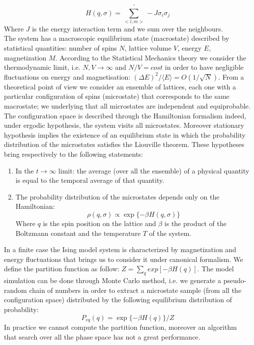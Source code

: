 \documentclass[11pt,a4paper]{article}
\begin{document}
\begin{equation}
  H(q, \sigma) = \sum_{<l,m>}^{'} -J\sigma_i\sigma_j
\end{equation}
Where $J$ is the energy interaction term and we sum over the neighbours.
\\
The system has  a macroscopic equilibrium state (macrostate) described by statistical quantities: number of spins $N$, lattice volume $V$, energy $E$, magnetization $M$. According to the Statistical Mechanics theory we consider the thermodynamic limit, i.e. $N, V \rightarrow \infty$ and $N/V = cost$ in order to have negligible fluctuations on energy and magnetisation: $(\Delta E)^2 / \langle E \rangle = O  (1/ \sqrt{N}) $.
From a theoretical point of view we consider an ensemble of lattices, each one with a particular configuration of spins (microstate) that corresponds to the same macrostate; we underlying that all microstates are independent and equiprobable. The configuration space is described through the Hamiltonian formalism indeed, under ergodic hypothesis, the system visits all microstates. Moreover stationary hypothesis implies the existence of an equilibrium state in which  the probability distribution of the microstates satisfies the Liouville theorem. These hypotheses bring respectively to the following statements:

\begin{enumerate}
\item In the $t \rightarrow \infty$ limit: the average (over all the ensemble) of a physical quantity is equal to the temporal average of that quantity.
\item The probability distribution of the microstates depends only on the Hamiltonian:
  \begin{equation}
    \rho (q, \sigma ) \propto \exp \lbrace- \beta H(q, \sigma ) \rbrace
  \end{equation}
  Where $q$ is the spin position on the lattice and $\beta$ is the product of the Boltzmann constant and the temperature $T$ of the system.
\end{enumerate}


In a finite case the Ising model system is characterized by magnetization and  energy fluctuations that brings us to consider it under canonical formalism. We define the partition function as follow: $Z = \sum_q exp [  -\beta H(q) ]$. The model simulation can be done through Monte Carlo method, i.e. we generate a pseudo-random chain of numbers in order to extract a microstate sample (from all the configuration space) distributed by the following equilibrium distribution of probability:
\begin{equation}
  P_{eq}(q)=\exp \lbrace -\beta H(q)\rbrace /Z
\end{equation}
In practice we cannot compute the partition function, moreover an algorithm that search over all the phase space has not a great performance.
\end{document}

